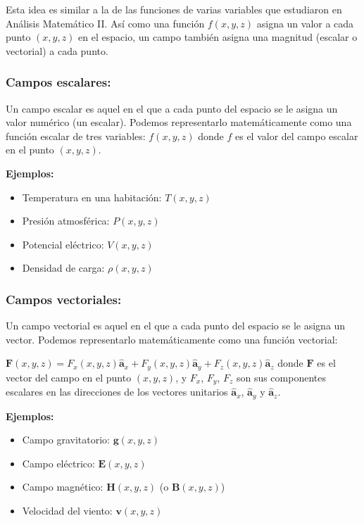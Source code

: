 \documentclass{article}
\begin{document}
Esta idea es similar a la de las funciones de varias variables que estudiaron en Análisis Matemático II. Así como una función $f(x, y, z)$ asigna un valor a cada punto $(x, y, z)$ en el espacio, un campo también asigna una magnitud (escalar o vectorial) a cada punto.

\subsubsection{Campos escalares:}

Un campo escalar es aquel en el que a cada punto del espacio se le asigna un valor numérico (un escalar). Podemos representarlo matemáticamente como una función escalar de tres variables: $f(x, y, z)$ donde $f$ es el valor del campo escalar en el punto $(x, y, z)$.

\textbf{Ejemplos:}
\begin{itemize}
    \item [\textbullet]Temperatura en una habitación: $T(x, y, z)$
    \item [\textbullet]Presión atmosférica: $P(x, y, z)$
    \item [\textbullet]Potencial eléctrico: $V(x, y, z)$
    \item [\textbullet]Densidad de carga: $\rho(x, y, z)$
\end{itemize}

\subsubsection{Campos vectoriales:}

Un campo vectorial es aquel en el que a cada punto del espacio se le asigna un vector. Podemos representarlo matemáticamente como una función vectorial:

$\mathbf{F}(x, y, z) = F_x(x, y, z) \mathbf{\hat{a}}_x + F_y(x, y, z) \mathbf{\hat{a}}_y + F_z(x, y, z) \mathbf{\hat{a}}_z$ donde $\mathbf{F}$ es el vector del campo en el punto $(x, y, z)$, y $F_x$, $F_y$, $F_z$ son sus componentes escalares en las direcciones de los vectores unitarios $\mathbf{\hat{a}}_x$, $\mathbf{\hat{a}}_y$ y $\mathbf{\hat{a}}_z$.

\textbf{Ejemplos:}
\begin{itemize}
    \item [\textbullet]Campo gravitatorio: $\mathbf{g}(x, y, z)$
    \item [\textbullet]Campo eléctrico: $\mathbf{E}(x, y, z)$
    \item [\textbullet]Campo magnético: $\mathbf{H}(x, y, z)$ (o $\mathbf{B}(x, y, z)$)
    \item [\textbullet]Velocidad del viento: $\mathbf{v}(x, y, z)$
\end{itemize}
\end{document}
